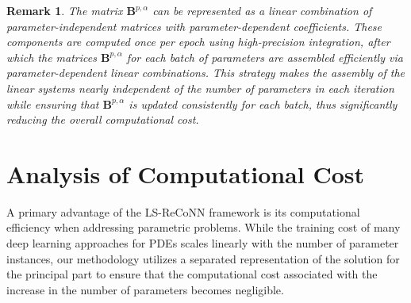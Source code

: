 \documentclass[oneside]{article}
\newtheorem{remark}[theorem]{Remark}
\begin{document}
\begin{remark}
    The matrix $\mathbf{B}^{p,\alpha}$ can be represented as a linear combination of parameter-independent matrices with parameter-dependent coefficients. These components are computed once per epoch using high-precision integration, after which the matrices $\mathbf{B}^{p,\alpha}$ for each batch of parameters are assembled efficiently via parameter-dependent linear combinations. This strategy makes the assembly of the linear systems nearly independent of the number of parameters in each iteration while ensuring that $\mathbf{B}^{p,\alpha}$ is updated consistently for each batch, thus significantly reducing the overall computational cost.
\end{remark}





\section{Analysis of Computational Cost}\label{Analysis of Computational Cost}

\noindent A primary advantage of the LS-ReCoNN framework is its computational efficiency when addressing parametric problems. While the training cost of many deep learning approaches for PDEs scales linearly with the number of parameter instances, our methodology utilizes a separated representation of the solution for the principal part to ensure that the computational cost associated with the increase in the number of parameters becomes negligible.
\end{document}
